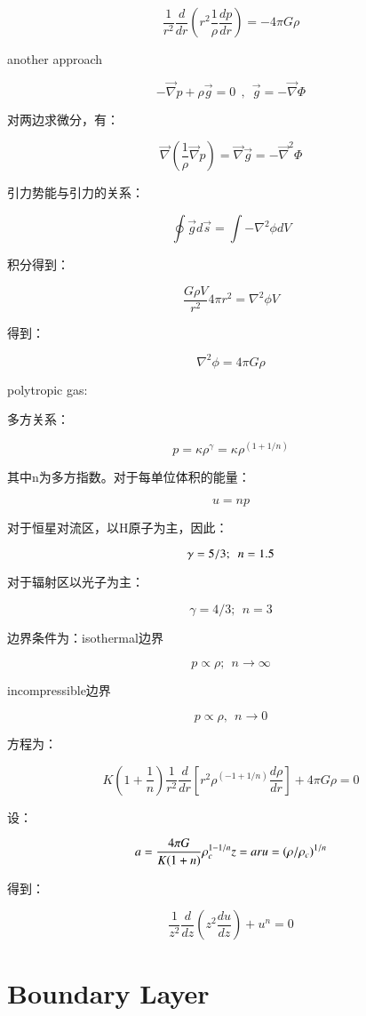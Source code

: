 \documentclass[fontset=windows]{report}
\begin{document}
\[\frac{1}{r^2} \frac{d}{dr}  \left( r^2\frac{1}{\rho}\frac{dp}{dr}   \right)=-4\pi G\rho\]

another approach

\[-\vec{\nabla}p+\rho \vec g =0 \ \ , \ \ \vec g=-\vec\nabla \Phi\]

对两边求微分，有：

\[\vec \nabla (\frac{1}{\rho}\vec\nabla p)=\vec \nabla \vec g=-\vec\nabla ^2 \Phi\]

引力势能与引力的关系：

\[\oint \vec gd\vec s=\int -\nabla^2\phi dV\]

积分得到：

\[\frac{G\rho V}{r^2}4\pi r^2=\nabla^2 \phi V\]

得到：

\[\nabla^2 \phi = 4\pi G \rho\]

polytropic gas:

多方关系：

\[p = \kappa \rho ^{\gamma}=\kappa\rho^{(1+1/n)}\]

其中n为多方指数。对于每单位体积的能量：

\[u=np\]

对于恒星对流区，以H原子为主，因此：

\[\gamma = 5/3;\ \ n=1.5\\\]

对于辐射区以光子为主：

\[\gamma=4/3;\ \ n=3\]

边界条件为：isothermal边界

\[p\propto\rho; \ \ n\rightarrow \infty\]

incompressible边界

\[p \propto \rho ,\ \ n\rightarrow 0\]

方程为：

\[K\left(1+\frac{1}{n}\right)\frac{1}{r^2}\frac{d}{dr}\left[r^2\rho^{(-1+1/n)}\frac{d\rho}{dr}\right]+4\pi G\rho=0\]

设：

\[a=\frac{4\pi G}{K(1+n)}\rho_c^{1-1/n} \\
z=ar\\
u=(\rho/\rho_c)^{1/n}\]

得到：

\[\frac{1}{z^2}\frac{d}{dz}(z^2\frac{du}{dz})+u^n=0\]

\section{Boundary Layer}
\end{document}
